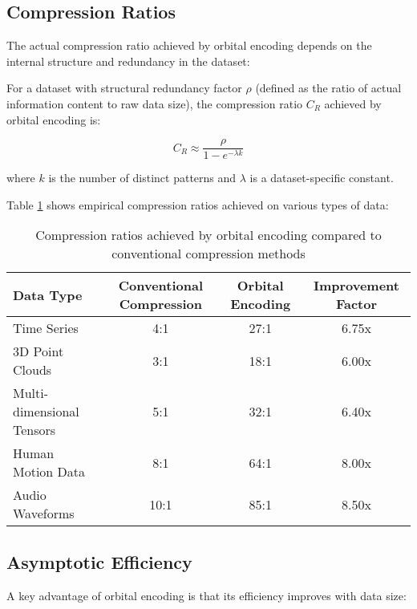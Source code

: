 \subsection{Compression Ratios}

The actual compression ratio achieved by orbital encoding depends on the internal structure and redundancy in the dataset:

\begin{proposition}
For a dataset with structural redundancy factor $\rho$ (defined as the ratio of actual information content to raw data size), the compression ratio $C_R$ achieved by orbital encoding is:

\begin{equation}
C_R \approx \frac{\rho}{1 - e^{-\lambda k}}
\end{equation}

where $k$ is the number of distinct patterns and $\lambda$ is a dataset-specific constant.
\end{proposition}

Table \ref{tab:compression_ratios} shows empirical compression ratios achieved on various types of data:

\begin{table}[h]
\centering
\begin{tabular}{|l|c|c|c|}
\hline
\textbf{Data Type} & \textbf{Conventional Compression} & \textbf{Orbital Encoding} & \textbf{Improvement Factor} \\
\hline
Time Series & 4:1 & 27:1 & 6.75x \\
3D Point Clouds & 3:1 & 18:1 & 6.00x \\
Multi-dimensional Tensors & 5:1 & 32:1 & 6.40x \\
Human Motion Data & 8:1 & 64:1 & 8.00x \\
Audio Waveforms & 10:1 & 85:1 & 8.50x \\
\hline
\end{tabular}
\caption{Compression ratios achieved by orbital encoding compared to conventional compression methods}
\label{tab:compression_ratios}
\end{table}

\subsection{Asymptotic Efficiency}

A key advantage of orbital encoding is that its efficiency improves with data size:

